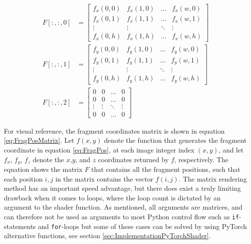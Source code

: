 \begin{equation}\label{eq:FragPosMatrix}
\begin{aligned}
    F[:,:,0] &= 
    \begin{bmatrix} 
        f_x(0,0)    & f_x(1,0)  & \dots     & f_x(w,0)  \\
        f_x(0,1)    & f_x(1,1)  & \dots     & f_x(w,1)  \\
        \vdots      & \vdots    & \ddots    & \vdots    \\
        f_x(0,h)    & f_x(1,h)  & \dots     & f_x(w,h)  
    \end{bmatrix} \\
    F[:,:,1] &= 
    \begin{bmatrix} 
        f_y(0,0)    & f_y(1,0)  & \dots     & f_y(w,0)  \\
        f_y(0,1)    & f_y(1,1)  & \dots     & f_y(w,1)  \\
        \vdots      & \vdots    & \ddots    & \vdots    \\
        f_y(0,h)    & f_y(1,h)  & \dots     & f_y(w,h)  
    \end{bmatrix} \\
    F[:,:,2] &= 
    \begin{bmatrix} 
        0    & 0  & \dots     & 0  \\
        0    & 0  & \dots     & 0  \\
        \vdots      & \vdots    & \ddots    & \vdots    \\
        0    & 0  & \dots     & 0  
    \end{bmatrix}
\end{aligned}
\end{equation}

For visual reference, the fragment coordinates matrix is shown in equation \ref{eq:FragPosMatrix}. Let $f(x,y)$ denote the function that generates the fragment coordinate in equation \ref{eq:FragPos}, at each image integer index $(x,y)$, and let $f_x$, $f_y$, $f_z$ denote the $x$,$y$, and $z$ coordinates returned by $f$, respectively. The equation shows the matrix $F$ that contains all the fragment positions, such that each position $i,j$ in the matrix contains the vector $f(i,j)$. 
The matrix rendering method has an important speed advantage, but there does exist a truly limiting drawback when it comes to loops, where the loop count is dictated by an argument to the shader function. As mentioned, all arguments are matrices, and can therefore not be used as arguments to most Python control flow such as \texttt{if}-statements and \texttt{for}-loops but some of these cases can be solved by using PyTorch alternative functions, see section \ref{sec:ImplementationPyTorchShader}.


